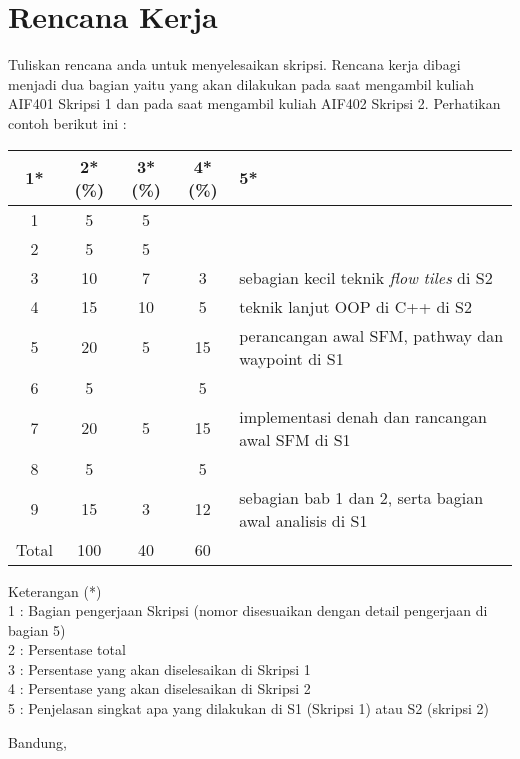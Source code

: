 \documentclass[a4paper,twoside]{article}
\begin{document}
\section{Rencana Kerja}
Tuliskan rencana anda untuk menyelesaikan skripsi. Rencana kerja dibagi menjadi dua bagian yaitu yang akan dilakukan pada saat mengambil kuliah AIF401 Skripsi 1 dan pada saat mengambil kuliah AIF402 Skripsi 2. Perhatikan contoh berikut ini :


\begin{center}
  \begin{tabular}{ | c | c | c | c | l |}
    \hline
    1*  & 2*(\%) & 3*(\%) & 4*(\%) &5*\\ \hline \hline
    1   & 5  & 5  &  &  \\ \hline
    2   & 5 & 5  &   & \\ \hline
    3   & 10  & 7  & 3 & {\footnotesize sebagian kecil teknik {\it flow tiles} di S2}  \\ \hline
    4   & 15  & 10  &  5 & {\footnotesize teknik lanjut OOP di C++ di S2} \\ \hline
    5   & 20  & 5  & 15 & {\footnotesize perancangan awal SFM, pathway dan waypoint di S1} \\ \hline
    6   & 5 &   & 5  & \\ \hline
    7   & 20  & 5  & 15 &  {\footnotesize implementasi denah dan rancangan awal SFM di S1}\\ \hline
    8   & 5  &   &  5  & \\ \hline
    9   & 15  & 3  & 12  & {\footnotesize sebagian bab 1 dan 2, serta bagian awal analisis di S1}\\ \hline
    Total  & 100  & 40  & 60 &  \\ \hline
                          \end{tabular}
\end{center}

Keterangan (*)\\
1 : Bagian pengerjaan Skripsi (nomor disesuaikan dengan detail pengerjaan di bagian 5)\\
2 : Persentase total \\
3 : Persentase yang akan diselesaikan di Skripsi 1 \\
4 : Persentase yang akan diselesaikan di Skripsi 2 \\
5 : Penjelasan singkat apa yang dilakukan di S1 (Skripsi 1) atau S2 (skripsi 2)

\vspace{1cm}
\centering Bandung, \tanggal\\
\vspace{2cm} \nama \\ 
\vspace{1cm}
\end{document}
